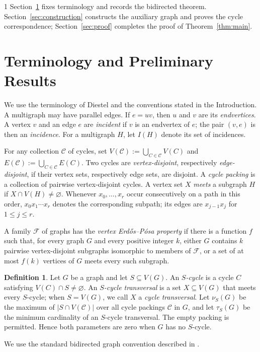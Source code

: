 \documentclass[a4paper,11pt]{article}
\theoremstyle{plain}
\theoremstyle{definition}
\newtheorem{definition}[theorem]{Definition}
\theoremstyle{remark}
\newcommand{\cC}{\mathcal{C}}
\begin{document}
\begin{spacing}{1}
Section~\ref{sec:prelim} fixes terminology and records the bidirected theorem.
Section~\ref{sec:construction} constructs the auxiliary graph and proves the
cycle correspondence; Section~\ref{sec:proof} completes the proof of
Theorem~\ref{thm:main}.

\section{Terminology and Preliminary Results}\label{sec:prelim}

We use the terminology of Diestel \cite{Diestel2017} and the conventions
stated in the Introduction.  A multigraph may have parallel edges.  If
$e=uv$, then $u$ and $v$ are its \emph{endvertices}.  A vertex $v$ and an
edge $e$ are \emph{incident} if $v$ is an endvertex of $e$; the pair $(v,e)$
is then an \emph{incidence}.  For a multigraph $H$, let $I(H)$ denote its set
of incidences.

For any collection $\cC$ of cycles, set
$V(\cC):=\bigcup_{C\in\cC}V(C)$ and
$E(\cC):=\bigcup_{C\in\cC}E(C)$.  Two cycles are
\emph{vertex-disjoint}, respectively \emph{edge-disjoint}, if their vertex
sets, respectively edge sets, are disjoint.  A \emph{cycle packing} is a
collection of pairwise vertex-disjoint cycles.  A vertex set $X$ \emph{meets}
a subgraph $H$ if $X\cap V(H)\neq\varnothing$.  Whenever
$x_0,\ldots,x_r$ occur consecutively on a path in this order,
$x_0x_1\cdots x_r$ denotes the corresponding subpath; its edges are
$x_{j-1}x_j$ for $1\leq j\leq r$.

A family $\mathcal{F}$ of graphs has the \emph{vertex Erd\H{o}s--P\'osa
property} if there is a function $f$ such that, for every graph $G$ and every
positive integer $k$, either $G$ contains $k$ pairwise vertex-disjoint
subgraphs isomorphic to members of $\mathcal{F}$, or a set of at most $f(k)$
vertices of $G$ meets every such subgraph.

\begin{definition}\label{def:parameters}
Let $G$ be a graph and let $S\subseteq V(G)$.  An \emph{$S$-cycle} is a cycle
$C$ satisfying $V(C)\cap S\neq\varnothing$.  An \emph{$S$-cycle transversal}
is a set $X\subseteq V(G)$ that meets every $S$-cycle; when $S=V(G)$, we call
$X$ a \emph{cycle transversal}.  Let $\nu_S(G)$ be the maximum of
$|S\cap V(\cC)|$ over all cycle packings $\cC$ in $G$, and let $\tau_S(G)$
be the minimum cardinality of an $S$-cycle transversal.  The empty packing is
permitted.  Hence both parameters are zero when $G$ has no $S$-cycle.
\end{definition}
We use the standard bidirected graph convention described in
\cite{BowlerEtAlMenger2023,BowlerEtAl2026}.


\end{spacing}
\end{document}

